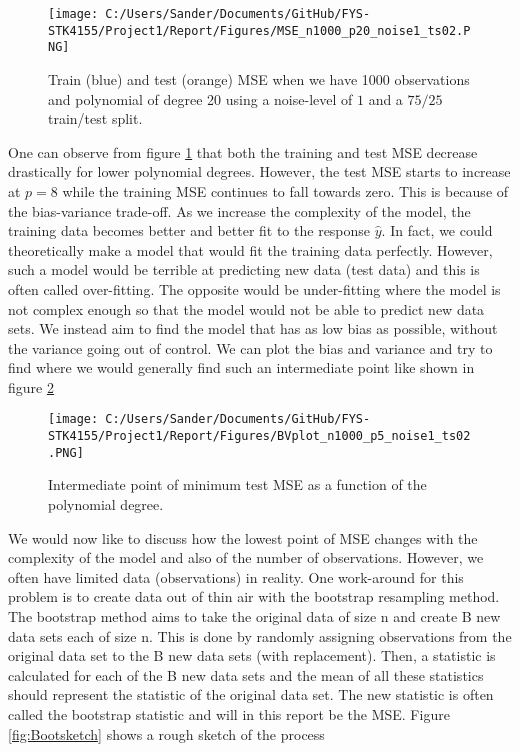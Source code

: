 \documentclass[12pt,a4paper]{article}
\begin{document}
\begin{figure}[H]
\centering
\texttt{[image: C:/Users/Sander/Documents/GitHub/FYS-STK4155/Project1/Report/Figures/MSE\_n1000\_p20\_noise1\_ts02.PNG]}
\caption{\label{fig:MSE1} Train (blue) and test (orange) MSE when we have 1000 observations and polynomial of degree 20 using a noise-level of $1$ and a $75/25$ train/test split.}
\end{figure}

\noindent One can observe from figure \ref{fig:MSE1} that both the training and test MSE decrease drastically for lower polynomial degrees. However, the test MSE starts to increase at $p = 8$ while the training MSE continues to fall towards zero. This is because of the bias-variance trade-off. As we increase the complexity of the model, the training data becomes better and better fit to the response $\hat{y}$. In fact, we could theoretically make a model that would fit the training data perfectly. However, such a model would be terrible at predicting new data (test data) and this is often called over-fitting. The opposite would be under-fitting where the model is not complex enough so that the model would not be able to predict new data sets. We instead aim to find the model that has as low bias as possible, without the variance going out of control. We can plot the bias and variance and try to find where we would generally find such an intermediate point like shown in figure \ref{fig:BVplot1}

\begin{figure}[H]
\centering
\texttt{[image: C:/Users/Sander/Documents/GitHub/FYS-STK4155/Project1/Report/Figures/BVplot\_n1000\_p5\_noise1\_ts02.PNG]}
\caption{\label{fig:BVplot1} Intermediate point of minimum test MSE as a function of the polynomial degree.}
\end{figure}

\noindent We would now like to discuss how the lowest point of MSE changes with the complexity of the model and also of the number of observations. However, we often have limited data (observations) in reality. One work-around for this problem is to create data out of thin air with the bootstrap resampling method. The bootstrap method aims to take the original data of size n and create B new data sets each of size n. This is done by randomly assigning observations from the original data set to the B new data sets (with replacement). Then, a statistic is calculated for each of the B new data sets and the mean of all these statistics should represent the statistic of the original data set. The new statistic is often called the bootstrap statistic and will in this report be the MSE. Figure \ref{fig:Bootsketch} shows a rough sketch of the process
\end{document}
